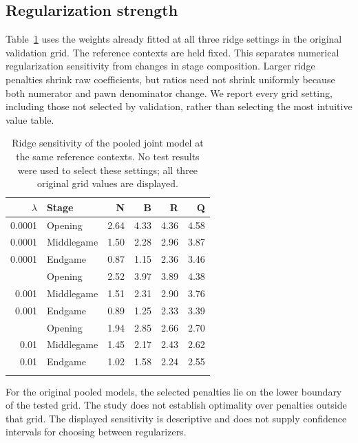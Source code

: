 \documentclass{jcst}
\begin{document}
\subsection{Regularization strength}
Table~\ref{tab:ridge} uses the weights already fitted at all three ridge settings in the original validation grid. The reference contexts are held fixed. This separates numerical regularization sensitivity from changes in stage composition. Larger ridge penalties shrink raw coefficients, but ratios need not shrink uniformly because both numerator and pawn denominator change. We report every grid setting, including those not selected by validation, rather than selecting the most intuitive value table.
\begin{table}[tbp]\centering
\small
\caption{Ridge sensitivity of the pooled joint model at the same reference contexts. No test results were used to select these settings; all three original grid values are displayed.}\label{tab:ridge}
\begin{tabular}{rlrrrr}
\toprule
$\lambda$ & Stage & N & B & R & Q\\\midrule
0.0001 & Opening & 2.64 & 4.33 & 4.36 & 4.58\\
0.0001 & Middlegame & 1.50 & 2.28 & 2.96 & 3.87\\
0.0001 & Endgame & 0.87 & 1.15 & 2.36 & 3.46\\
\addlinespace
0.001 & Opening & 2.52 & 3.97 & 3.89 & 4.38\\
0.001 & Middlegame & 1.51 & 2.31 & 2.90 & 3.76\\
0.001 & Endgame & 0.89 & 1.25 & 2.33 & 3.39\\
\addlinespace
0.01 & Opening & 1.94 & 2.85 & 2.66 & 2.70\\
0.01 & Middlegame & 1.45 & 2.17 & 2.43 & 2.62\\
0.01 & Endgame & 1.02 & 1.58 & 2.24 & 2.55\\
\addlinespace
\bottomrule\end{tabular}\end{table}

For the original pooled models, the selected penalties lie on the lower boundary of the tested grid. The study does not establish optimality over penalties outside that grid. The displayed sensitivity is descriptive and does not supply confidence intervals for choosing between regularizers.
\end{document}
